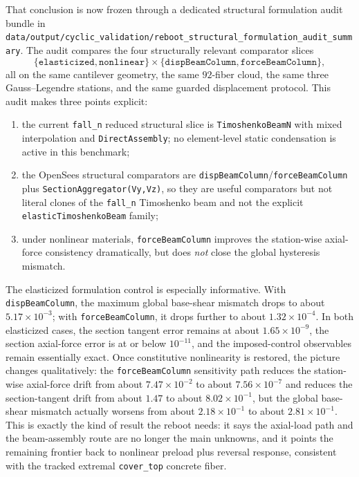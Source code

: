 That conclusion is now frozen through a dedicated structural formulation audit
bundle in
\texttt{data/output/cyclic\_validation/reboot\_structural\_formulation\_audit\_summary}.
The audit compares the four structurally relevant comparator slices
\[
  \{\texttt{elasticized},\texttt{nonlinear}\}
  \times
  \{\texttt{dispBeamColumn},\texttt{forceBeamColumn}\},
\]
all on the same cantilever geometry, the same \(92\)-fiber cloud, the same
three Gauss--Legendre stations, and the same guarded displacement protocol.
This audit makes three points explicit:
\begin{enumerate}
  \item the current \texttt{fall\_n} reduced structural slice is
    \texttt{TimoshenkoBeamN} with mixed interpolation and
    \texttt{DirectAssembly}; no element-level static condensation is active in
    this benchmark;
  \item the OpenSees structural comparators are
    \texttt{dispBeamColumn}/\texttt{forceBeamColumn} plus
    \texttt{SectionAggregator(Vy,Vz)}, so they are useful comparators but not
    literal clones of the \texttt{fall\_n} Timoshenko beam and not the
    explicit \texttt{elasticTimoshenkoBeam} family;
  \item under nonlinear materials, \texttt{forceBeamColumn} improves the
    station-wise axial-force consistency dramatically, but does \emph{not}
    close the global hysteresis mismatch.
\end{enumerate}

The elasticized formulation control is especially informative.  With
\texttt{dispBeamColumn}, the maximum global base-shear mismatch drops to about
\(5.17\times10^{-3}\); with \texttt{forceBeamColumn}, it drops further to
about \(1.32\times10^{-4}\).  In both elasticized cases, the section tangent
error remains at about \(1.65\times10^{-9}\), the section axial-force error is
at or below \(10^{-11}\), and the imposed-control observables remain essentially
exact.  Once constitutive nonlinearity is restored, the picture changes
qualitatively: the \texttt{forceBeamColumn} sensitivity path reduces the
station-wise axial-force drift from about \(7.47\times10^{-2}\) to about
\(7.56\times10^{-7}\) and reduces the section-tangent drift from about
\(1.47\) to about \(8.02\times10^{-1}\), but the global base-shear mismatch
actually worsens from about \(2.18\times10^{-1}\) to about
\(2.81\times10^{-1}\).  This is exactly the kind of result the reboot needs:
it says the axial-load path and the beam-assembly route are no longer the main
unknowns, and it points the remaining frontier back to nonlinear preload plus
reversal response, consistent with the tracked extremal \texttt{cover\_top}
concrete fiber.

